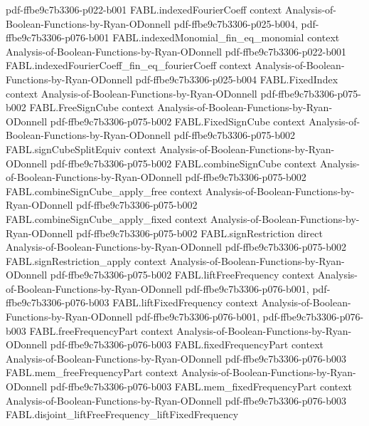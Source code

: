 \begin{theorem}
{    pdf-ffbe9c7b3306-p022-b001}
\proofstep
  {FABL.indexedFourierCoeff}
  {context}
  {Analysis-of-Boolean-Functions-by-Ryan-ODonnell}
  {pdf-ffbe9c7b3306-p025-b004,
    pdf-ffbe9c7b3306-p076-b001}
\proofstep
  {FABL.indexedMonomial_fin_eq_monomial}
  {context}
  {Analysis-of-Boolean-Functions-by-Ryan-ODonnell}
  {pdf-ffbe9c7b3306-p022-b001}
\proofstep
  {FABL.indexedFourierCoeff_fin_eq_fourierCoeff}
  {context}
  {Analysis-of-Boolean-Functions-by-Ryan-ODonnell}
  {pdf-ffbe9c7b3306-p025-b004}
\proofstep
  {FABL.FixedIndex}
  {context}
  {Analysis-of-Boolean-Functions-by-Ryan-ODonnell}
  {pdf-ffbe9c7b3306-p075-b002}
\proofstep
  {FABL.FreeSignCube}
  {context}
  {Analysis-of-Boolean-Functions-by-Ryan-ODonnell}
  {pdf-ffbe9c7b3306-p075-b002}
\proofstep
  {FABL.FixedSignCube}
  {context}
  {Analysis-of-Boolean-Functions-by-Ryan-ODonnell}
  {pdf-ffbe9c7b3306-p075-b002}
\proofstep
  {FABL.signCubeSplitEquiv}
  {context}
  {Analysis-of-Boolean-Functions-by-Ryan-ODonnell}
  {pdf-ffbe9c7b3306-p075-b002}
\proofstep
  {FABL.combineSignCube}
  {context}
  {Analysis-of-Boolean-Functions-by-Ryan-ODonnell}
  {pdf-ffbe9c7b3306-p075-b002}
\proofstep
  {FABL.combineSignCube_apply_free}
  {context}
  {Analysis-of-Boolean-Functions-by-Ryan-ODonnell}
  {pdf-ffbe9c7b3306-p075-b002}
\proofstep
  {FABL.combineSignCube_apply_fixed}
  {context}
  {Analysis-of-Boolean-Functions-by-Ryan-ODonnell}
  {pdf-ffbe9c7b3306-p075-b002}
\proofstep
  {FABL.signRestriction}
  {direct}
  {Analysis-of-Boolean-Functions-by-Ryan-ODonnell}
  {pdf-ffbe9c7b3306-p075-b002}
\proofstep
  {FABL.signRestriction_apply}
  {context}
  {Analysis-of-Boolean-Functions-by-Ryan-ODonnell}
  {pdf-ffbe9c7b3306-p075-b002}
\proofstep
  {FABL.liftFreeFrequency}
  {context}
  {Analysis-of-Boolean-Functions-by-Ryan-ODonnell}
  {pdf-ffbe9c7b3306-p076-b001,
    pdf-ffbe9c7b3306-p076-b003}
\proofstep
  {FABL.liftFixedFrequency}
  {context}
  {Analysis-of-Boolean-Functions-by-Ryan-ODonnell}
  {pdf-ffbe9c7b3306-p076-b001,
    pdf-ffbe9c7b3306-p076-b003}
\proofstep
  {FABL.freeFrequencyPart}
  {context}
  {Analysis-of-Boolean-Functions-by-Ryan-ODonnell}
  {pdf-ffbe9c7b3306-p076-b003}
\proofstep
  {FABL.fixedFrequencyPart}
  {context}
  {Analysis-of-Boolean-Functions-by-Ryan-ODonnell}
  {pdf-ffbe9c7b3306-p076-b003}
\proofstep
  {FABL.mem_freeFrequencyPart}
  {context}
  {Analysis-of-Boolean-Functions-by-Ryan-ODonnell}
  {pdf-ffbe9c7b3306-p076-b003}
\proofstep
  {FABL.mem_fixedFrequencyPart}
  {context}
  {Analysis-of-Boolean-Functions-by-Ryan-ODonnell}
  {pdf-ffbe9c7b3306-p076-b003}
\proofstep
  {FABL.disjoint_liftFreeFrequency_liftFixedFrequency}

\end{theorem}
